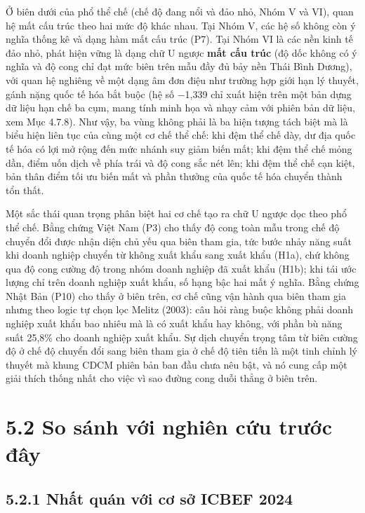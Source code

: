 \documentclass[
  a4paper,
  13pt]{extreport}
\begin{document}
Ở biên dưới của phổ thể chế (chế độ đang nổi và đảo nhỏ, Nhóm V và VI),
quan hệ mất cấu trúc theo hai mức độ khác nhau. Tại Nhóm V, các hệ số
không còn ý nghĩa thống kê và dạng hàm mất cấu trúc (P7). Tại Nhóm VI là
các nền kinh tế đảo nhỏ, phát hiện vững là dạng chữ U ngược \textbf{mất
cấu trúc} (độ dốc không có ý nghĩa và độ cong chỉ đạt mức biên trên mẫu
đầy đủ bảy nền Thái Bình Dương), với quan hệ nghiêng về một dạng âm đơn
điệu như trường hợp giới hạn lý thuyết, gánh nặng quốc tế hóa bắt buộc
(hệ số −1,339 chỉ xuất hiện trên một bản dựng dữ liệu hạn chế ba cụm,
mang tính minh họa và nhạy cảm với phiên bản dữ liệu, xem Mục 4.7.8).
Như vậy, ba vùng không phải là ba hiện tượng tách biệt mà là biểu hiện
liên tục của cùng một cơ chế thể chế: khi đệm thể chế dày, dư địa quốc
tế hóa có lợi mở rộng đến mức nhánh suy giảm biến mất; khi đệm thể chế
mỏng dần, điểm uốn dịch về phía trái và độ cong sắc nét lên; khi đệm thể
chế cạn kiệt, bản thân điểm tối ưu biến mất và phần thưởng của quốc tế
hóa chuyển thành tổn thất.

Một sắc thái quan trọng phân biệt hai cơ chế tạo ra chữ U ngược dọc theo
phổ thể chế. Bằng chứng Việt Nam (P3) cho thấy độ cong toàn mẫu trong
chế độ chuyển đổi được nhận diện chủ yếu qua biên tham gia, tức bước
nhảy năng suất khi doanh nghiệp chuyển từ không xuất khẩu sang xuất khẩu
(H1a), chứ không qua độ cong cường độ trong nhóm doanh nghiệp đã xuất
khẩu (H1b); khi tái ước lượng chỉ trên doanh nghiệp xuất khẩu, số hạng
bậc hai mất ý nghĩa. Bằng chứng Nhật Bản (P10) cho thấy ở biên trên, cơ
chế cũng vận hành qua biên tham gia nhưng theo logic tự chọn lọc Melitz
(2003): câu hỏi ràng buộc không phải doanh nghiệp xuất khẩu bao nhiêu mà
là có xuất khẩu hay không, với phần bù năng suất 25,8\% cho doanh nghiệp
xuất khẩu. Sự dịch chuyển trọng tâm từ biên cường độ ở chế độ chuyển đổi
sang biên tham gia ở chế độ tiên tiến là một tinh chỉnh lý thuyết mà
khung CDCM phiên bản ban đầu chưa nêu bật, và nó cung cấp một giải thích
thống nhất cho việc vì sao đường cong duỗi thẳng ở biên trên.

\hypertarget{so-suxe1nh-vux1edbi-nghiuxean-cux1ee9u-trux1b0ux1edbc-ux111uxe2y}{%
\section{5.2 So sánh với nghiên cứu trước
đây}\label{so-suxe1nh-vux1edbi-nghiuxean-cux1ee9u-trux1b0ux1edbc-ux111uxe2y}}

\hypertarget{nhux1ea5t-quuxe1n-vux1edbi-cux1a1-sux1edf-icbef-2024}{%
\subsection{5.2.1 Nhất quán với cơ sở ICBEF
2024}\label{nhux1ea5t-quuxe1n-vux1edbi-cux1a1-sux1edf-icbef-2024}}
\end{document}
